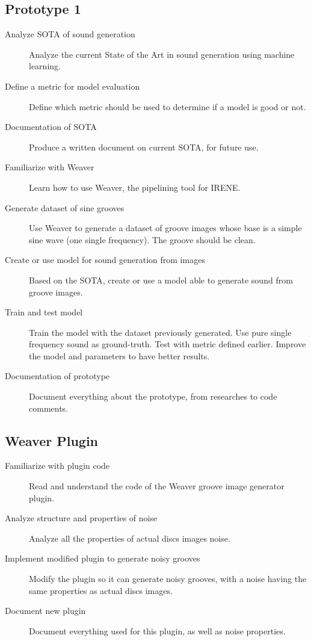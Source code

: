 \documentclass[12pt, twoside]{article}
\begin{document}
\subsection{Prototype 1}
\begin{description}
	\item[Analyze SOTA of sound generation] Analyze the current State of the Art in sound generation using machine learning.
	\item[Define a metric for model evaluation] Define which metric should be used to determine if a model is good or not.
	\item[Documentation of SOTA] Produce a written document on current SOTA, for future use.
	\item[Familiarize with Weaver] Learn how to use Weaver, the pipelining tool for IRENE.
	\item[Generate dataset of sine grooves] Use Weaver to generate a dataset of groove images whose base is a simple sine wave (one single frequency). The groove should be clean.
	\item[Create or use model for sound generation from images] Based on the SOTA, create or use a model able to generate sound from groove images.
	\item[Train and test model] Train the model with the dataset previously generated.  Use pure single frequency sound as ground-truth. Test with metric defined earlier. Improve the model and parameters to have better results.
	\item[Documentation of prototype] Document everything about the prototype, from researches to code comments.
\end{description}
\subsection{Weaver Plugin}
\begin{description}
	\item[Familiarize with plugin code] Read and understand the code of the Weaver groove image generator plugin.
	\item[Analyze structure and properties of noise] Analyze all the properties of actual discs images noise.
	\item[Implement modified plugin to generate noisy grooves] Modify the plugin so it can generate noisy grooves, with a noise having the same properties as actual discs images.
	\item[Document new plugin] Document everything used for this plugin, as well as noise properties.
\end{description}
\end{document}
